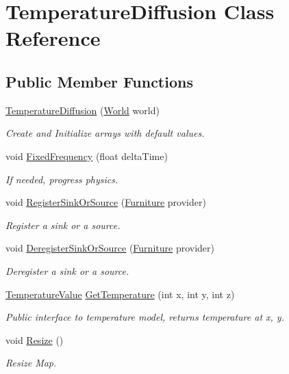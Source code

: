 \hypertarget{class_temperature_diffusion}{}\section{Temperature\+Diffusion Class Reference}
\label{class_temperature_diffusion}
\subsection*{Public Member Functions}
\begin{DoxyCompactItemize}
\item 
\hyperlink{class_temperature_diffusion_aa73aa039994d11bcd81249d843638377}{Temperature\+Diffusion} (\hyperlink{class_world}{World} world)
\begin{DoxyCompactList}\small\item\em Create and Initialize arrays with default values. \end{DoxyCompactList}\item 
void \hyperlink{class_temperature_diffusion_ac079af3d36f20c9fea50c79565cd7052}{Fixed\+Frequency} (float delta\+Time)
\begin{DoxyCompactList}\small\item\em If needed, progress physics. \end{DoxyCompactList}\item 
void \hyperlink{class_temperature_diffusion_adddffe95f6243220d7231398e9e1a9df}{Register\+Sink\+Or\+Source} (\hyperlink{class_furniture}{Furniture} provider)
\begin{DoxyCompactList}\small\item\em Register a sink or a source. \end{DoxyCompactList}\item 
void \hyperlink{class_temperature_diffusion_a4e5af68445b339aec17d7bc33b426e47}{Deregister\+Sink\+Or\+Source} (\hyperlink{class_furniture}{Furniture} provider)
\begin{DoxyCompactList}\small\item\em Deregister a sink or a source. \end{DoxyCompactList}\item 
\hyperlink{struct_temperature_value}{Temperature\+Value} \hyperlink{class_temperature_diffusion_ad0b5f88a095255ab3b4576b86178a762}{Get\+Temperature} (int x, int y, int z)
\begin{DoxyCompactList}\small\item\em Public interface to temperature model, returns temperature at x, y. \end{DoxyCompactList}\item 
void \hyperlink{class_temperature_diffusion_ad957fa5453b088548c14ad50a1d0556b}{Resize} ()
\begin{DoxyCompactList}\small\item\em Resize Map. \end{DoxyCompactList}\end{DoxyCompactItemize}


